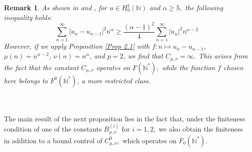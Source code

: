 \documentclass[11pt]{amsart}
\newtheorem{remark}[thm]{Remark}
\newcommand{\1}{[1]}
\begin{document}
\begin{remark} \label{rmk 2.2} As shown in \cite{Ye23} and \cite{Gup22}, for $u\in H_{0}^{1}(\mathbb{N})$ and $\alpha \geq 5,$ the following inequality holds:
$$ \sum_{n=1}^{\infty} |u_{n}-u_{n-1}|^2 n^{\alpha} \geq \frac{(\alpha-1)^2}{4}  \sum_{n=1}^{\infty} |u_n|^2 n^{\alpha-2}$$
However, if we apply Proposition \ref{Prop 2.1} with $f : n \mapsto u_n - u_{n-1}$, $\mu(n) = n^{\alpha-2}$, $\nu(n) = n^{\alpha}$, and $p = 2$, we find that $C_{\mu,\nu} = \infty$. This arises from the fact that the constant $C_{\mu,\nu}$ operates on $F(\mathbb{N}^{*}),$ while the function $f$ chosen here belongs to $F^0(\mathbb{N}^*)$, a more restricted class.
\end{remark}
\phantom{.} \\ \\
The main result of the next proposition lies in the fact that, under the finiteness condition of one of the constants $B_{\mu,\nu}^{(i)}$ for $i=1,2,$ we also obtain the finiteness in addition to a bound control of $C_{\mu,\nu}^{0},$ which operates on $F_{0}(\mathbb{N}^{*}).$
\end{document}
